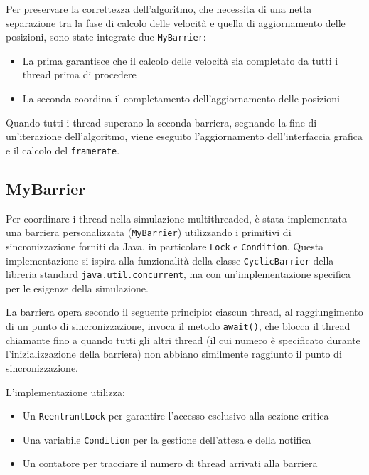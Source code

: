 \documentclass[a4paper,12pt]{report}
\begin{document}
        Per preservare la correttezza dell'algoritmo, che necessita di una netta separazione tra la fase di calcolo delle velocità e quella di aggiornamento delle posizioni, sono state integrate due \texttt{MyBarrier}:
        \begin{itemize}
            \item La prima garantisce che il calcolo delle velocità sia completato da tutti i thread prima di procedere
            \item La seconda coordina il completamento dell'aggiornamento delle posizioni
        \end{itemize}
        
        Quando tutti i thread superano la seconda barriera, segnando la fine di un'iterazione dell'algoritmo, viene eseguito l'aggiornamento dell'interfaccia grafica e il calcolo del \texttt{framerate}.
        
        \subsection{MyBarrier}
        Per coordinare i thread nella simulazione multithreaded, è stata implementata una barriera personalizzata (\texttt{MyBarrier}) utilizzando i primitivi di sincronizzazione forniti da Java, in particolare \texttt{Lock} e \texttt{Condition}. Questa implementazione si ispira alla funzionalità della classe \texttt{CyclicBarrier} della libreria standard \texttt{java.util.concurrent}, ma con un'implementazione specifica per le esigenze della simulazione.
        
        La barriera opera secondo il seguente principio: ciascun thread, al raggiungimento di un punto di sincronizzazione, invoca il metodo \texttt{await()}, che blocca il thread chiamante fino a quando tutti gli altri thread (il cui numero è specificato durante l'inizializzazione della barriera) non abbiano similmente raggiunto il punto di sincronizzazione.
        
        L'implementazione utilizza:
        \begin{itemize}
            \item Un \texttt{ReentrantLock} per garantire l'accesso esclusivo alla sezione critica
            \item Una variabile \texttt{Condition} per la gestione dell'attesa e della notifica
            \item Un contatore per tracciare il numero di thread arrivati alla barriera
        \end{itemize}
        
\end{document}
